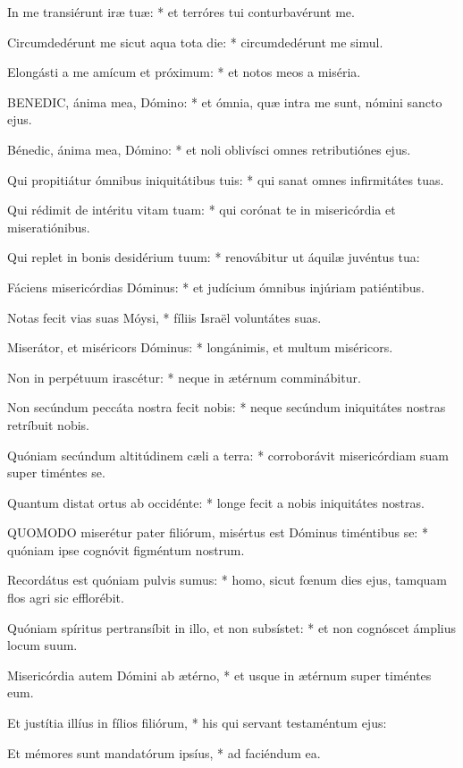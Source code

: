 In me transiérunt iræ tuæ: * et terróres tui conturbavérunt me.

Circumdedérunt me sicut aqua tota die: * circumdedérunt me simul.

Elongásti a me amícum et próximum: * et notos meos a miséria.


\lettrine[lines=2]{B}{ENEDIC}, ánima mea, Dómino: * et ómnia, quæ intra me sunt, nómini sancto ejus.

Bénedic, ánima mea, Dómino: * et noli oblivísci omnes retributiónes ejus.

Qui propitiátur ómnibus iniquitátibus tuis: * qui sanat omnes infirmitátes tuas.

Qui rédimit de intéritu vitam tuam: * qui corónat te in misericórdia et miseratiónibus.

Qui replet in bonis desidérium tuum: * renovábitur ut áquilæ juvéntus tua:

Fáciens misericórdias Dóminus: * et judícium ómnibus injúriam patiéntibus.

Notas fecit vias suas Móysi, * fíliis Israël voluntátes suas.

Miserátor, et miséricors Dóminus: * longánimis, et multum miséricors.

Non in perpétuum irascétur: * neque in ætérnum comminábitur.

Non secúndum peccáta nostra fecit nobis: * neque secúndum iniquitátes nostras retríbuit nobis.

Quóniam secúndum altitúdinem cæli a terra: * corroborávit misericórdiam suam super timéntes se.

Quantum distat ortus ab occidénte: * longe fecit a nobis iniquitátes nostras.


\lettrine[lines=2]{Q}{UOMODO} miserétur pater filiórum, misértus est Dóminus timéntibus se: * quóniam ipse cognóvit figméntum nostrum.

Recordátus est quóniam pulvis sumus: * homo, sicut fœnum dies ejus, tamquam flos agri sic efflorébit.

Quóniam spíritus pertransíbit in illo, et non subsístet: * et non cognóscet ámplius locum suum.

Misericórdia autem Dómini ab ætérno, * et usque in ætérnum super timéntes eum.

Et justítia illíus in fílios filiórum, * his qui servant testaméntum ejus:

Et mémores sunt mandatórum ipsíus, * ad faciéndum ea.


